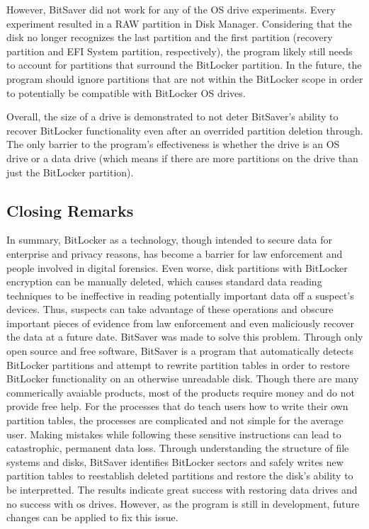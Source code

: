 \documentclass[conference]{IEEEtran} \IEEEoverridecommandlockouts
\begin{document}
However, BitSaver did not work for any of the OS drive experiments. Every
experiment resulted in a RAW partition in Disk Manager. Considering that the disk no longer
recognizes the last partition and the first partition (recovery partition and
EFI System partition, respectively), the program likely still needs to account
for partitions that surround the BitLocker partition. In the future, the program should ignore
partitions that are not within the BitLocker scope in order to potentially be compatible with 
BitLocker OS drives.

Overall, the size of a drive is demonstrated to not deter BitSaver's ability to recover 
BitLocker functionality even after an overrided partition deletion through.
The only barrier to the program's effectiveness is whether the drive
is an OS drive or a data drive (which means if there are more partitions on the drive than just the BitLocker partition).

\subsection{Closing Remarks} 
In summary, BitLocker as a technology, though intended to secure data for enterprise and privacy reasons, has become a barrier for
law enforcement and people involved in digital forensics. Even worse, disk partitions with BitLocker encryption can be manually deleted,
which causes standard data reading techniques to be ineffective in reading potentially important data off a suspect's devices. 
Thus, suspects can take advantage of these operations and obscure important
pieces of evidence from law enforcement and even maliciously recover the data at a future date. BitSaver was made to solve
this problem. Through only open source and free software, BitSaver is a program that automatically detects BitLocker partitions
and attempt to rewrite partition tables in order to restore BitLocker functionality on an otherwise unreadable disk. Though there are many commerically avaiable products,
most of the products require money and do not provide free help. For the processes that do teach users how to write their own partition tables, the processes are complicated and not simple for the average user.
Making mistakes while following these sensitive instructions can lead to catastrophic, permanent data loss. Through understanding the structure of file systems and disks, BitSaver identifies BitLocker sectors and safely writes new partition tables
to reestablish deleted partitions and restore the disk's ability to be interpretted. The results indicate great success with restoring
data drives and no success with os drives. However, as the program is still in development, future changes can be applied to fix this issue.
\end{document}
